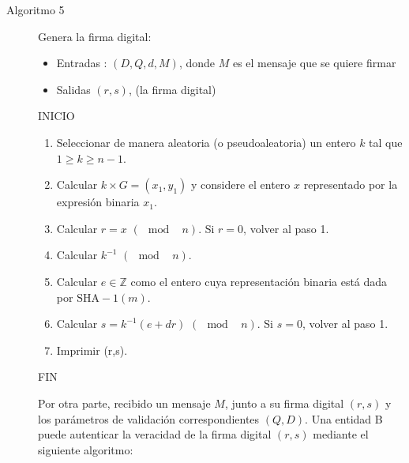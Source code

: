 \documentclass[11pt]{article}
\newcommand{\Z}{\mathbb{Z}}
\numberwithin{equation}{section} %
\numberwithin{figure}{section} %
\numberwithin{table}{section} %
\begin{document}
		\begin{description}%
		
		
			\item[Algoritmo 5] Genera la firma digital:%
			\begin{itemize}
				\item Entradas : $(D,Q,d,M)$, donde $M$ es el mensaje que se quiere firmar
				\item Salidas $(r,s)$, (la firma digital)
			\end{itemize}
			INICIO
			\begin{enumerate}
				\item Seleccionar de manera aleatoria (o pseudoaleatoria) un entero $k$ tal que $1\geq k\geq n-1$.
				\item Calcular $k\times G=(x_1,y_1)$ y considere el entero $x$ representado por la expresión binaria $x_1$.
				\item Calcular $r=x$ $(\mod\text{ }n)$. Si $r=0$, volver al paso 1.
				\item Calcular $k^{-1}$ $(\mod\text{ }n)$.
				\item Calcular $e\in \Z$ como el entero cuya representación binaria está dada por $\mathrm{SHA-1}(m)$.
				\item Calcular $s=k^{-1}(e+dr)$ $(\mod\text{ } n)$. Si $s=0$, volver al paso 1.
				\item Imprimir (r,s).
			\end{enumerate}
			FIN

		Por otra parte, recibido un mensaje $M$, junto a su firma digital $(r,s)$ y los parámetros de validación correspondientes $(Q,D)$. Una entidad B puede autenticar la veracidad de la firma digital $(r,s)$ mediante el siguiente algoritmo:

		

\end{description}
\end{document}
